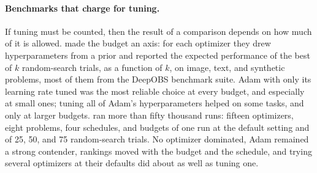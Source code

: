 \begin{refsection}
\paragraph{Benchmarks that charge for tuning.} If tuning must be counted, then the result of a comparison depends on how much of it is allowed. \Textcite{SivaprasadEtAl2020} made the budget an axis: for each optimizer they drew hyperparameters from a prior and reported the expected performance of the best of $k$ random-search trials, as a function of $k$, on image, text, and synthetic problems, most of them from the DeepOBS benchmark suite. Adam with only its learning rate tuned was the most reliable choice at every budget, and especially at small ones; tuning all of Adam's hyperparameters helped on some tasks, and only at larger budgets. \Textcite{SchmidtEtAl2021} ran more than fifty thousand runs: fifteen optimizers, eight problems, four schedules, and budgets of one run at the default setting and of 25, 50, and 75 random-search trials. No optimizer dominated, Adam remained a strong contender, rankings moved with the budget and the schedule, and trying several optimizers at their defaults did about as well as tuning one.


\end{refsection}
